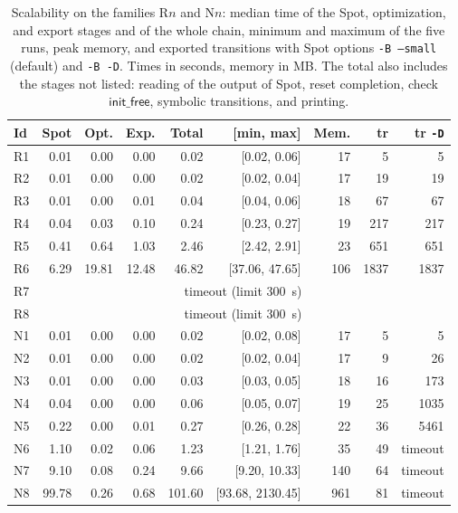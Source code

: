 \begin{table}[t]
\centering
\caption{Scalability on the families R$n$ and N$n$: median time of the Spot, optimization, and export stages and of the whole chain, minimum and maximum of the five runs, peak memory, and exported transitions with Spot options \texttt{-B --small} (default) and \texttt{-B -D}.  Times in seconds, memory in MB.  The total also includes the stages not listed: reading of the output of Spot, reset completion, check $\mathsf{init\_free}$, symbolic transitions, and printing.}
\label{tab:scaling}
\footnotesize
\setlength{\tabcolsep}{3pt}
\begin{tabular}{@{}lrrrrrrrr@{}}
\toprule
Id & Spot & Opt. & Exp. & Total & [min, max] & Mem. & tr & tr \texttt{-D}\\
\midrule
R1 & 0.01 & 0.00 & 0.00 & 0.02 & [0.02, 0.06] & 17 & 5 & 5\\
R2 & 0.01 & 0.00 & 0.00 & 0.02 & [0.02, 0.04] & 17 & 19 & 19\\
R3 & 0.01 & 0.00 & 0.01 & 0.04 & [0.04, 0.06] & 18 & 67 & 67\\
R4 & 0.04 & 0.03 & 0.10 & 0.24 & [0.23, 0.27] & 19 & 217 & 217\\
R5 & 0.41 & 0.64 & 1.03 & 2.46 & [2.42, 2.91] & 23 & 651 & 651\\
R6 & 6.29 & 19.81 & 12.48 & 46.82 & [37.06, 47.65] & 106 & 1837 & 1837\\
R7 & \multicolumn{8}{c}{timeout (limit 300~s)}\\
R8 & \multicolumn{8}{c}{timeout (limit 300~s)}\\
N1 & 0.01 & 0.00 & 0.00 & 0.02 & [0.02, 0.08] & 17 & 5 & 5\\
N2 & 0.01 & 0.00 & 0.00 & 0.02 & [0.02, 0.04] & 17 & 9 & 26\\
N3 & 0.01 & 0.00 & 0.00 & 0.03 & [0.03, 0.05] & 18 & 16 & 173\\
N4 & 0.04 & 0.00 & 0.00 & 0.06 & [0.05, 0.07] & 19 & 25 & 1035\\
N5 & 0.22 & 0.00 & 0.01 & 0.27 & [0.26, 0.28] & 22 & 36 & 5461\\
N6 & 1.10 & 0.02 & 0.06 & 1.23 & [1.21, 1.76] & 35 & 49 & timeout\\
N7 & 9.10 & 0.08 & 0.24 & 9.66 & [9.20, 10.33] & 140 & 64 & timeout\\
N8 & 99.78 & 0.26 & 0.68 & 101.60 & [93.68, 2130.45] & 961 & 81 & timeout\\
\bottomrule
\end{tabular}
\end{table}
